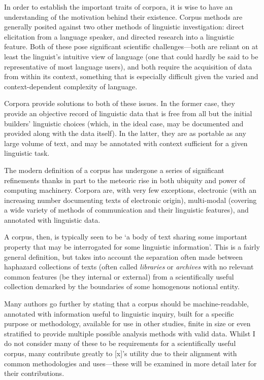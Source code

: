 In order to establish the important traits of corpora, it is wise to have an understanding of the motivation behind their existence.  Corpus methods are generally posited against two other methods of linguistic investigation: direct elicitation from a language speaker, and directed research into a linguistic feature.  Both of these pose significant scientific challenges---both are reliant on at least the linguist's intuitive view of language (one that could hardly be said to be representative of most language users), and both require the acquisition of data from within its context, something that is especially difficult given the varied and context-dependent complexity of language.

Corpora provide solutions to both of these issues.  In the former case, they provide an objective record of linguistic data that is free from all but the initial builders' linguistic choices (which, in the ideal case, may be documented and provided along with the data itself).  In the latter, they are as portable as any large volume of text, and may be annotated with context sufficient for a given linguistic task.


The modern definition of a corpus has undergone a series of significant refinements thanks in part to the meteoric rise in both ubiquity and power of computing machinery.  Corpora are, with very few exceptions, electronic (with an increasing number documenting texts of electronic origin), multi-modal (covering a wide variety of methods of communication and their linguistic features), and annotated with linguistic data.  


A corpus, then, is typically seen to be `a body of text sharing some important property that may be interrogated for some linguistic information'.  This is a fairly general definition, but takes into account the separation often made between haphazard collections of texts (often called \textsl{libraries} or \textsl{archives} with no relevant common features (be they internal or external) from a scientifically useful collection demarked by the boundaries of some homogenous notional entity.

Many authors %
go further by stating that a corpus should be machine-readable, annotated with information useful to linguistic inquiry, built for a specific purpose or methodology, available for use in other studies, finite in size or even stratified to provide multiple possible analysis methods with valid data.  Whilst I do not consider many of these to be requirements for a scientifically useful corpus, many contribute greatly to [x]'s utility due to their alignment with common methodologies and uses---these will be examined in more detail later for their contributions.





